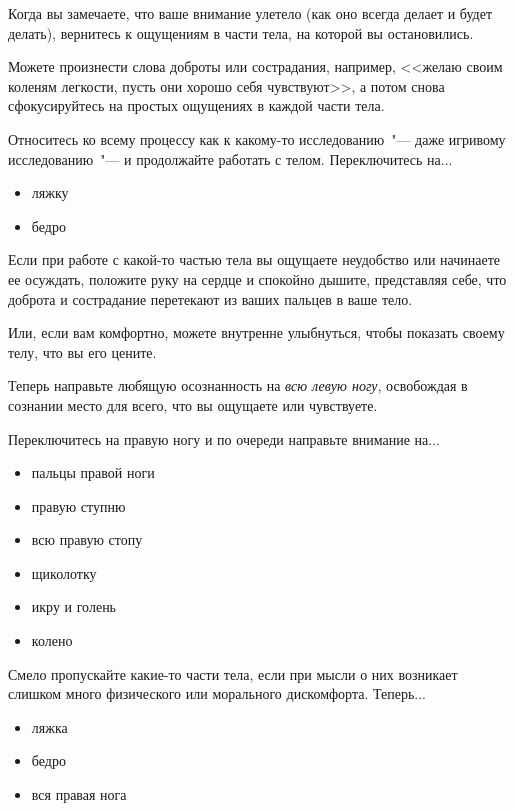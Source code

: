 \begin{itemize}
	\itemdiamondsuit Когда вы замечаете, что ваше внимание улетело (как оно всегда делает и будет делать), вернитесь к ощущениям в части тела, на которой вы остановились.
	
	\itemdiamondsuit Можете произнести слова доброты или сострадания, например, <<желаю своим коленям легкости, пусть они хорошо себя чувствуют>>, а потом снова сфокусируйтесь на простых ощущениях в каждой части тела.
	
	\itemdiamondsuit Относитесь ко всему процессу как к какому-то исследованию~"--- даже игривому исследованию~"--- и продолжайте работать с телом. Переключитесь на...
	\begin{itemize}
		\item ляжку
		\item бедро
	\end{itemize}
	
	\itemdiamondsuit Если при работе с какой-то частью тела вы ощущаете неудобство или начинаете ее осуждать, положите руку на сердце и спокойно дышите, представляя себе, что доброта и сострадание перетекают из ваших пальцев в ваше тело.
	
	\itemdiamondsuit Или, если вам комфортно, можете внутренне улыбнуться, чтобы показать своему телу, что вы его цените.
	
	\itemdiamondsuit Теперь направьте любящую осознанность на \emph{всю левую ногу}, освобождая в сознании место для всего, что вы ощущаете или чувствуете.
	
	\itemdiamondsuit Переключитесь на правую ногу и по очереди направьте внимание на...
	\begin{itemize}
		\item пальцы правой ноги
		\item правую ступню
		\item всю правую стопу
		\item щиколотку
		\item икру и голень
		\item колено
	\end{itemize}
	
	\itemdiamondsuit Смело пропускайте какие-то части тела, если при мысли о них возникает слишком много физического или морального дискомфорта. Теперь...
	\begin{itemize}
		\item ляжка
		\item бедро
		\item вся правая нога
	\end{itemize}
	

\end{itemize}
